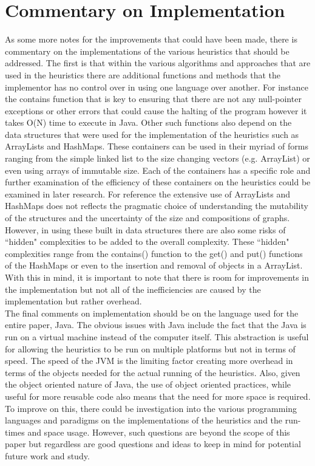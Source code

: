 \documentclass[midd]{thesis}
\newcommand{\tab}{\hspace*{2em}}
\begin{document}
\section{Commentary on Implementation}
\tab As some more notes for the improvements that could have been made, there is commentary on the implementations of the various heuristics that should be addressed. The first is that within the various algorithms and approaches that are used in the heuristics there are additional functions and methods that the implementor has no control over in using one language over another. For instance the contains function that is key to ensuring that there are not any null-pointer exceptions or other errors that could cause the halting of the program however it takes O(N) time to execute in Java. Other such functions also depend on the data structures that were used for the implementation of the heuristics such as ArrayLists and HashMaps. These containers can be used in their myriad of forms ranging from the simple linked list to the size changing vectors (e.g. ArrayList) or even using arrays of immutable size. Each of the containers has a specific role and further examination of the efficiency of these containers on the heuristics could be examined in later research. For reference the extensive use of ArrayLists and HashMaps does not reflects the pragmatic choice of understanding the mutability of the structures and the uncertainty of the size and compositions of graphs. However, in using these built in data structures there are also some risks of ``hidden" complexities to be added to the overall complexity. These ``hidden" complexities range from the contains() function to the get() and put() functions of the HashMaps or even to the insertion and removal of objects in a ArrayList. With this in mind, it is important to note that there is room for improvements in the implementation but not all of the inefficiencies are caused by the implementation but rather overhead.\\
\tab The final comments on implementation should be on the language used for the entire paper, Java. The obvious issues with Java include the fact that the Java is run on a virtual machine instead of the computer itself. This abstraction is useful for allowing the heuristics to be run on multiple platforms but not in terms of speed. The speed of the JVM is the limiting factor creating more overhead in terms of the objects needed for the actual running of the heuristics. Also, given the object oriented nature of Java, the use of object oriented practices, while useful for more reusable code also means that the need for more space is required. To improve on this, there could be investigation into the various programming languages and paradigms on the implementations of the heuristics and the run-times and space usage. However, such questions are beyond the scope of this paper but regardless are good questions and ideas to keep in mind for potential future work and study.\\
\end{document}
